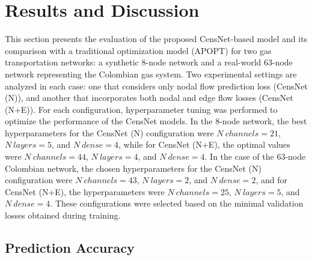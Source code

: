 %
%


\section{Results and Discussion}

This section presents the evaluation of the proposed CensNet-based model and its comparison with a traditional optimization model (APOPT) for two gas transportation networks: a synthetic 8-node network and a real-world 63-node network representing the Colombian gas system. Two experimental settings are analyzed in each case: one that considers only nodal flow prediction loss (CensNet (N)), and another that incorporates both nodal and edge flow losses (CensNet (N+E)). For each configuration, hyperparameter tuning was performed to optimize the performance of the CensNet models. In the 8-node network, the best hyperparameters for the CensNet (N) configuration were $N \  channels=21$, $N \  layers=5$, and $N \  dense=4$, while for CensNet (N+E), the optimal values were $N \  channels=44$, $N \  layers=4$, and $N \  dense=4$. In the case of the 63-node Colombian network, the chosen hyperparameters for the CensNet (N) configuration were $N \  channels=43$, $N \  layers=2$, and $N \  dense=2$, and for CensNet (N+E), the hyperparameters were $N \  channels=25$, $N \  layers=5$, and $N \  dense=4$. These configurations were selected based on the minimal validation losses obtained during training.

\subsection{Prediction Accuracy}

